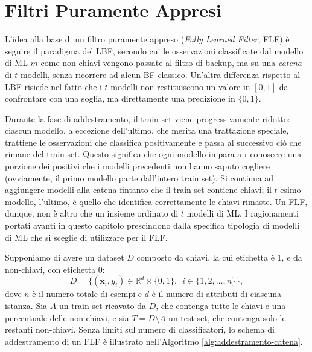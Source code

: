 \section{Filtri Puramente Appresi}
L'idea alla base di un filtro puramente appreso (\textit{Fully Learned Filter}, FLF) è seguire il paradigma del LBF, secondo cui le osservazioni classificate dal modello di ML $m$ come non-chiavi vengono passate al filtro di backup, ma su una \textit{catena} di $t$ modelli, senza ricorrere ad alcun BF classico. Un'altra differenza rispetto al LBF risiede nel fatto che i $t$ modelli non restituiscono un valore in $[0,1]$ da confrontare con una soglia, ma direttamente una predizione in $\{0,1\}$.

Durante la fase di addestramento, il train set viene progressivamente ridotto: ciascun modello, a eccezione dell'ultimo, che merita una trattazione speciale, trattiene le osservazioni che classifica positivamente e passa al successivo ciò che rimane del train set. Questo significa che ogni modello impara a riconoscere una porzione dei positivi che i modelli precedenti non hanno saputo cogliere (ovviamente, il primo modello parte dall'intero train set). Si continua ad aggiungere modelli alla catena fintanto che il train set contiene chiavi; il $t$-esimo modello, l'ultimo, è quello che identifica correttamente le chiavi rimaste.
Un FLF, dunque, non è altro che un insieme ordinato di $t$ modelli di ML. I ragionamenti portati avanti in questo capitolo prescindono dalla specifica tipologia di modelli di ML che si sceglie di utilizzare per il FLF.

Supponiamo di avere un dataset $D$ composto da chiavi, la cui etichetta è 1, e da non-chiavi, con etichetta 0:
\begin{equation}
    D = \{ (\mathbf{x}_i, y_i) \in \mathbb{R}^d \times \{0,1 \}, \enspace i \in \{1,2, \dots, n \} \},
\end{equation}
dove $n$ è il numero totale di esempi e $d$ è il numero di attributi di ciascuna istanza. Sia $A$ un train set ricavato da $D$, che contenga tutte le chiavi e una percentuale delle non-chiavi, e sia $T=D\setminus A$ un test set, che contenga solo le restanti non-chiavi.
Senza limiti sul numero di classificatori, lo schema di addestramento di un FLF è illustrato nell'Algoritmo \ref{alg:addestramento-catena}.

